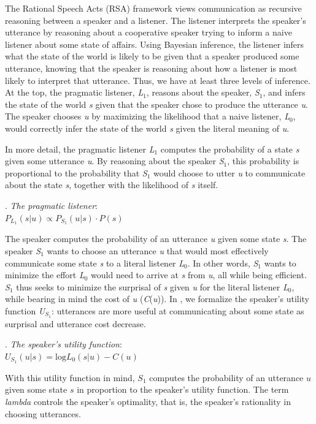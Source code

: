 \documentclass[linguex]{sp}
\begin{document}
The Rational Speech Acts (RSA) framework views communication as recursive reasoning between a speaker and a listener. The listener interprets the speaker's utterance by reasoning about a cooperative speaker trying to inform a naive listener about some state of affairs. Using Bayesian inference, the listener infers what the state of the world is likely to be given that a speaker produced some utterance, knowing that the speaker is reasoning about how a listener is most likely to interpret that utterance. Thus, we have at least three levels of inference. At the top, the pragmatic listener, \emph{L}$_{1}$, reasons about the speaker, \emph{S}$_{1}$, and infers the state of the world \emph{s} given that the speaker chose to produce the utterance \emph{u}. The speaker chooses \emph{u} by maximizing the likelihood that a naive listener, \emph{L}$_{0}$, would correctly infer the state of the world \emph{s} given the literal meaning of \emph{u}.

In more detail, the pragmatic listener \emph{L}$_{1}$ computes the probability of a state \emph{s} given some utterance \emph{u}. By reasoning about the speaker \emph{S}$_{1}$, this probability is proportional to the probability that \emph{S}$_{1}$ would choose to utter \emph{u} to communicate about the state \emph{s}, together with the likelihood of \emph{s} itself.

\ex. \emph{The pragmatic listener}:\\
$P_{L_{1}}(s|u) \propto P_{S_{1}}(u|s) \cdot P(s)$

The speaker  computes the probability of an utterance \emph{u} given some state \emph{s}. 
The speaker \emph{S}$_{1}$ wants to choose an utterance \emph{u} that would most effectively communicate some state \emph{s} to a literal listener \emph{L}$_{0}$. In other words, \emph{S}$_{1}$ wants to minimize the effort \emph{L}$_{0}$ would need to arrive at \emph{s} from \emph{u}, all while being efficient. \emph{S}$_{1}$ thus seeks to minimize the surprisal of \emph{s} given \emph{u} for the literal listener \emph{L}$_{0}$, while bearing in mind the cost of \emph{u} (\emph{C}(\emph{u})). In \Next, we formalize the speaker's utility function \emph{U}$_{S_{1}}$: utterances are more useful at communicating about some state as surprisal and utterance cost decrease.

\ex. \emph{The speaker's utility function}:\\
$U_{S_{1}}(u|s) = \textrm{log}L_{0}(s|u) - C(u)$

With this utility function in mind, $S_{1}$ computes the probability of an utterance $u$ given some state $s$ in proportion to the speaker's utility function. The term \emph{lambda} controls the speaker's optimality, that is, the speaker's rationality in choosing utterances.
\end{document}

